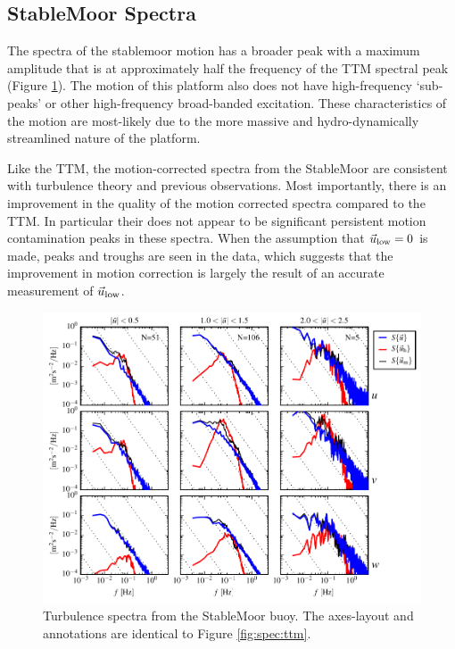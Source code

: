 \documentclass[twocol]{ametsoc}
\begin{document}
\subsection{StableMoor Spectra}

The spectra of the stablemoor motion has a broader peak with a maximum amplitude that is at approximately half the frequency of the TTM spectral peak (Figure \ref{fig:spec:sm}). The motion of this platform also does not have high-frequency `sub-peaks' or other high-frequency broad-banded excitation. These characteristics of the motion are most-likely due to the more massive and hydro-dynamically streamlined nature of the platform. 

Like the TTM, the motion-corrected spectra from the StableMoor are consistent with turbulence theory and previous observations. Most importantly, there is an improvement in the quality of the motion corrected spectra compared to the TTM. In particular their does not appear to be significant persistent motion contamination peaks in these spectra. When the assumption that $\vec{u}_\mathrm{low}=0$ is made, peaks and troughs are seen in the data, which suggests that the improvement in motion correction is largely the result of an accurate measurement of $\vec{u}_\mathrm{low}$.

\begin{figure}[t]
  \centering
  \includegraphics{SpecFig02_SMnose}
  \caption{Turbulence spectra from the StableMoor buoy. The axes-layout and annotations are identical to Figure \ref{fig:spec:ttm}.}
  \label{fig:spec:sm}
\end{figure}
\end{document}
